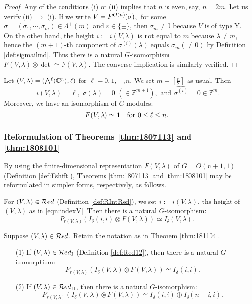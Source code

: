 \begin{proof}
Any of the conditions (i) or (ii) implies
 that $n$ is even, 
 say,  $n=2m$.  
Let us verify (ii) $\Rightarrow$ (i).  
If we write $V = F^{{O(n)}}({\sigma})_{\varepsilon}$
 for some $\sigma=(\sigma_1, \cdots, \sigma_m) \in \Lambda^+(m)$
 and $\varepsilon\in \{\pm\}$, 
 then $\sigma_m \ne 0$
 because $V$ is of type Y.  
On the other hand,
 the height $i:=i(V,\lambda)$ is not equal to $m$
 because $\lambda \ne m$, 
 hence the $(m+1)$-th component of $\sigma^{(i)}(\lambda)$ equals 
 $\sigma_m (\ne 0)$
 by Definition \ref{def:sigmailmd}.  
Thus there is a natural $G$-isomorphism
 $F(V, \lambda) \otimes \det \simeq F(V, \lambda)$.  
The converse implication is similarly verified.  
\end{proof}
\begin{example}
\label{ex:FVexterior}
Let $(V,\lambda)=(\Exterior^\ell({\mathbb{C}}^n), \ell)$
 for $\ell=0,1,\cdots,n$.  
We set $m=[\frac n 2]$ as usual.  
Then
\[
\text{
 $i(V,\lambda)=\ell,\,\,
 \sigma(\lambda)=0$
 $(\in {\mathbb{Z}}^{m+1}),$ 
 and
 $\widehat{\sigma^{(i)}}=0 \in {\mathbb{Z}}^m$.
}  
\]
Moreover, 
we have an isomorphism of $G$-modules:
\[
   F(V,\lambda)\simeq {\bf{1}}
\quad
  \text{for $0 \le \ell \le n$}.
\]
\end{example}


\subsubsection{Reformulation of Theorems \ref{thm:1807113} and \ref{thm:1808101}}

By using the finite-dimensional representation $F(V,\lambda)$
 of $G=O(n+1,1)$
 (Definition \ref{def:Fshift}), 
 Theorems \ref{thm:1807113} and \ref{thm:1808101}
 may be reformulated in simpler forms, 
respectively, 
 as follows.  
\begin{theorem}
\label{thm:181104}
For $(V,\lambda) \in {\mathcal{R}}ed$
 (Definition \ref{def:RIntRed}), 
 we set 
$i:=i(V,\lambda)$, 
 the height of $(V,\lambda)$
 as in \eqref{eqn:indexV}.  
Then there is a natural $G$-isomorphism:
\[
  P_{r(V,\lambda)}(I_{\delta}(i,i) \otimes F(V,\lambda))
  \simeq 
  I_{\delta}(V, \lambda).  
\]
\end{theorem}

\begin{theorem}
\label{thm:181107}
Suppose $(V,\lambda) \in {\mathcal{R}}ed$.  
Retain the notation as in Theorem \ref{thm:181104}.  
\begin{enumerate}
\item[{\rm{(1)}}]
If $(V,\lambda) \in {\mathcal{R}}ed_{\operatorname{I}}$
(Definition \ref{def:Red12}), 
 then there is a natural $G$-isomorphism:
\[
  P_{r(V,\lambda)}(I_{\delta}(V, \lambda) \otimes F(V,\lambda))
  \simeq 
  I_{\delta}(i, i).  
\]
\item[{\rm{(2)}}]
If $(V,\lambda) \in {\mathcal{R}}ed_{\operatorname{I I}}$, 
 then there is a natural $G$-isomorphism:
\[
  P_{r(V,\lambda)}(I_{\delta}(V, \lambda) \otimes F(V,\lambda))
  \simeq 
  I_{\delta}(i, i) \oplus I_{\delta}(n-i, i).  
\]
\end{enumerate}
\end{theorem}

